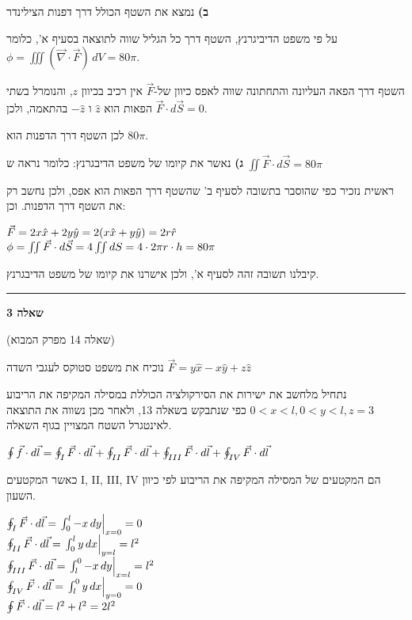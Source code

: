 \documentclass[14pt]{extarticle}
\makeatletter
\newenvironment{lefteqs}{%
    \begin{english}%
    \begin{flushleft}%
    \renewcommand{\arraystretch}{1.3}%
    $\begin{array}{@{}l@{}}%
}{%
    \end{array}$%
    \end{flushleft}%
    \end{english}%
}
\makeatother
\begin{document}
\textbf{ב)}
נמצא את השטף הכולל דרך דפנות הצילינדר

על פי משפט הדיביגרנץ, השטף דרך כל הגליל שווה לתוצאה בסעיף א', כלומר $\phi = \iiint (\vec{\nabla} \cdot \vec{F}) \, dV = 80 \pi$.

השטף דרך הפאה העליונה והתחתונה שווה לאפס כיוון של-$\vec{F}$ אין רכיב בכיוון $z$, 
והנומרל בשתי הפאות הוא $\hat{z}$ ו $-\hat{z}$ בהתאמה, ולכן $\vec{F} \cdot d\vec{S} = 0$.

לכן השטף דרך הדפנות הוא $80 \pi$.

\textbf{ג)}
נאשר את קיומו של משפט הדיבגרנץ: כלומר נראה ש $\iint \vec{F} \cdot d\vec{S} = 80 \pi$

ראשית נזכיר כפי שהוסבר בתשובה לסעיף ב' שהשטף דרך הפאות הוא אפס, ולכן נחשב רק את השטף דרך הדפנות. וכן:

\begin{lefteqs}
    \vec{F} = 2x \hat{x} + 2y \hat{y} = 2(x \hat{x} + y \hat{y}) = 2r \hat{r} \\
    \phi = \iint \vec{F} \cdot d\vec{S} = 4 \iint dS = 4 \cdot 2\pi r \cdot h = 80 \pi
\end{lefteqs}

קיבלנו תשובה זהה לסעיף א', ולכן אישרנו את קיומו של משפט הדיבגרנץ.

\vspace{3em}
\hrule
\vspace{2em}

\textbf{\large שאלה 3}

(שאלה 14 מפרק המבוא)

נוכיח את משפט סטוקס לעגבי השדה $\vec{F} = y\hat{x} - x\hat{y} + z\hat{z}$

נתחיל מלחשב את ישירות את הסירקולציה הכוללת במסילה המקיפה את הריבוע $0<x<l, 0<y<l, z=3$ כפי שנתבקש בשאלה 13,
ולאחר מכן נשווה את התוצאה לאינטגרל השטח המצויין בגוף השאלה.

\begin{lefteqs}
    \oint \vec{f} \cdot d\vec{l} = \oint_{I} \vec{F} \cdot d\vec{l} + \oint_{II} \vec{F} \cdot d\vec{l} + \oint_{III} \vec{F} \cdot d\vec{l} + \oint_{IV} \vec{F} \cdot d\vec{l}
\end{lefteqs}

כאשר המקטעים I, II, III, IV הם המקטעים של המסילה המקיפה את הריבוע לפי כיוון השעון.

\begin{lefteqs}
    \oint_{I} \vec{F} \cdot d\vec{l} = \left. \int_{0}^{l} -x \, dy \right|_{x=0} = 0 \\
    \oint_{II} \vec{F} \cdot d\vec{l} = \left. \int_{0}^{l} y \, dx \right|_{y=l} = l^2 \\
    \oint_{III} \vec{F} \cdot d\vec{l} = \left. \int_{l}^{0} -x \, dy \right|_{x=l} = l^2 \\
    \oint_{IV} \vec{F} \cdot d\vec{l} = \left. \int_{l}^{0} y \, dx \right|_{y=0} = 0 \\
    \oint \vec{F} \cdot d\vec{l} = l^2 + l^2 = 2l^2
\end{lefteqs}
\end{document}
